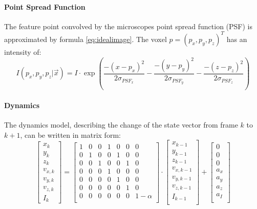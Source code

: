 \documentclass{scrartcl}
\begin{document}
\paragraph{Point Spread Function} The feature point convolved by the microscopes point spread function (PSF) is approximated by formula \ref{eq:idealimage}. The voxel $p = (p_x, p_y, p_z)^T$ has an intensity of:
\begin{equation}
\label{eq:idealimage}
	I(p_x,p_y,p_z|\vec{x}) = I \cdot \exp\left(\frac{-(x-p_x)^2}{2\sigma_{PSF_x}}-\frac{-(y-p_y)^2}{2\sigma_{PSF_y}}-\frac{-(z-p_z)^2}{2\sigma_{PSF_z}}\right)
\end{equation}

\paragraph{Dynamics} The dynamics model, describing the change of the state vector from frame $k$ to $k+1$, can be written in matrix form:
\begin{equation}
\label{eq:dynamicmodel}
\left[
\begin{array}{*{1}{c}}
	x_k \\
	y_k \\
	z_k	\\
	v_{x, k} \\
	v_{y, k} \\
	v_{z, k} \\	
	I_k
\end{array}
\right] = 
\left[
\begin{array}{*{7}{c}}
	1 & 0 & 0 & 1 & 0 & 0 & 0\\
	0 & 1 & 0 & 0 & 1 & 0 & 0\\
	0 & 0 & 1 & 0 & 0 & 1 & 0\\
	0 & 0 & 0 & 1 & 0 & 0 & 0\\
	0 & 0 & 0 & 0 & 1 & 0 & 0\\
	0 & 0 & 0 & 0 & 0 & 1 & 0\\
	0 & 0 & 0 & 0 & 0 & 0 & 1-\alpha\\
\end{array}
\right]\cdot
\left[
\begin{array}{*{1}{c}}
	x_{k-1} \\
	y_{k-1} \\
	z_{k-1}	\\
	v_{x, k-1} \\
	v_{y, k-1} \\
	v_{z, k-1} \\	
	I_{k-1}\\
\end{array}\right] + 
\left[
\begin{array}{*{1}{c}}
	0 \\
	0 \\
	0	\\
	a_x \\
	a_y \\
	a_z \\	
	a_I \\
\end{array}\right]
\end{equation}
\end{document}
